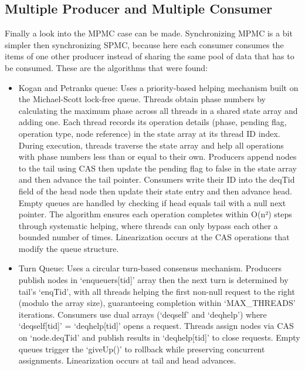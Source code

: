 \subsection{Multiple Producer and Multiple Consumer}\label{subsec:multiple-producer-and-multiple-consumer}
Finally a look into the \ac{MPMC} case can be made. Synchronizing \ac{MPMC} is a bit simpler then synchronizing \ac{SPMC}, because here each consumer consumes the items of one other producer instead of sharing the same pool of data that has to be consumed. These are the algorithms that were found:
\begin{itemize}
   \item  Kogan and Petranks queue: Uses a priority-based helping mechanism built on the Michael-Scott lock-free queue. Threads obtain phase numbers by calculating the maximum phase across all threads in a shared state array and adding one. Each thread records its operation details (phase, pending flag, operation type, node reference) in the state array at its thread ID index. During execution, threads traverse the state array and help all operations with phase numbers less than or equal to their own. Producers append nodes to the tail using \ac{CAS} then update the pending flag to false in the state array and then advance the tail pointer. Consumers write their ID into the deqTid field of the head node then update their state entry and then advance head. Empty queues are handled by checking if head equals tail with a null next pointer. The algorithm ensures each operation completes within O(n²) steps through systematic helping, where threads can only bypass each other a bounded number of times. Linearization occurs at the \ac{CAS} operations that modify the queue structure. \cite{Kogan2011WaitFreeQueues}
   \item Turn Queue: Uses a circular turn-based consensus mechanism. Producers publish nodes in \enquote*{enqueuers[tid]} array then the next turn is determined by tail's \enquote*{enqTid}, with all threads helping the first non-null request to the right (modulo the array size), guaranteeing completion within \enquote*{MAX\_THREADS} iterations. Consumers use dual arrays (\enquote*{deqself} and \enquote*{deqhelp}) where \enquote*{deqself[tid]} = \enquote*{deqhelp[tid]} opens a request. Threads assign nodes via \ac{CAS} on \enquote*{node.deqTid} and publish results in \enquote*{deqhelp[tid]} to close requests. Empty queues trigger the \enquote*{giveUp()} to rollback while preserving concurrent assignments. Linearization occurs at tail and head advances. \cite{RamalheteQueue}

\end{itemize}
